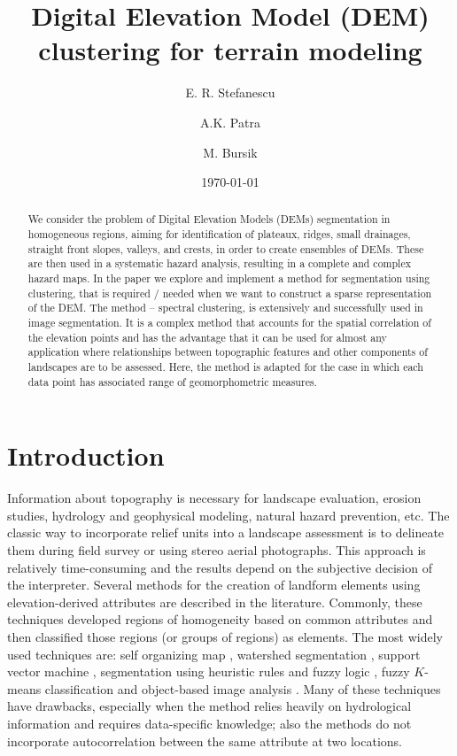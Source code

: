 \documentclass[12pt,letterpaper]{article}
\title{Digital Elevation Model (DEM) clustering for terrain modeling}
\author[1]{ E. R. Stefanescu }
\author[1]{A.K. Patra}
\author[2]{M. Bursik}
\affil[1]{Department of Mechanical and Aerospace Engineering, University at Buffalo, Buffalo, NY 14260}
\affil[2]{Department of Geology, University at Buffalo, Buffalo, NY 14260 }
\date{\today}
\begin{document}
\linenumbers
\maketitle

\begin{abstract}
We consider the problem of Digital Elevation Models (DEMs) segmentation 
in homogeneous regions, aiming for identification of plateaux, ridges, small drainages,
straight front slopes, valleys, and crests, in order to create ensembles of DEMs. These 
are then used in a systematic hazard analysis, resulting in a complete and complex
hazard maps. In the paper we explore and implement a method 
for segmentation using clustering, that is required / needed when we want to construct a 
sparse representation of the DEM.  The method -- spectral clustering, is extensively and 
successfully used in image segmentation. It is a complex 
method that accounts for the spatial correlation of the 
elevation points and has the advantage that it can be used for almost any application 
where relationships between topographic features and other components of landscapes 
are to be assessed. Here, the method is adapted for the case in 
which each data point has associated range of geomorphometric measures. 
\end{abstract}

\section{Introduction}
Information about topography is necessary for landscape evaluation, erosion studies,
hydrology and geophysical modeling, natural hazard prevention, etc. The classic way to 
incorporate relief units into a landscape assessment is to delineate them during field survey
or using stereo aerial photographs. This approach is relatively time-consuming and the results
depend on the subjective decision of the interpreter.
Several methods for the creation of landform elements using elevation-derived attributes are
described in the literature. Commonly, these techniques developed regions of homogeneity based
on common attributes and then classified those regions (or groups of regions) as elements. The 
most widely used techniques are: self organizing map \citep{Koh1995}, watershed segmentation 
\citep{Najman1996}, support vector machine \citep{Gunn1997}, segmentation using heuristic rules 
and fuzzy logic \citep{Sonka1999}, fuzzy $K$-means classification \citep{Burrough2000} and object-based 
image analysis \citep{Carleer2005}. Many of these techniques have drawbacks, especially when the
 method relies heavily on hydrological information and  requires data-specific knowledge; also the 
 methods do not incorporate autocorrelation between the same attribute at two locations.
 
\end{document}
